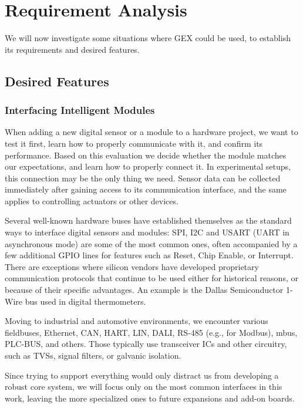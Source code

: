 \chapter{Requirement Analysis}

We will now investigate some situations where GEX could be used, to establish its requirements and desired features.

\section{Desired Features}

\subsection{Interfacing Intelligent Modules}\label{sec:uses_digital_ifaces}

When adding a new digital sensor or a module to a hardware project, we want to test it first, learn how to properly communicate with it, and confirm its performance. Based on this evaluation we decide whether the module matches our expectations, and learn how to properly connect it. In experimental setups, this connection may be the only thing we need. Sensor data can be collected immediately after gaining access to its communication interface, and the same applies to controlling actuators or other devices.

Several well-known hardware buses have established themselves as the standard ways to interface digital sensors and modules: \gls{SPI}, \gls{I2C} and \gls{USART} (\gls{UART} in asynchronous mode) are some of the most common ones, often accompanied by a few additional \gls{GPIO} lines for features such as Reset, Chip Enable, or Interrupt. There are exceptions where silicon vendors have developed proprietary communication protocols that continue to be used either for historical reasons, or because of their specific advantages. An example is the Dallas Semiconductor 1-Wire bus used in digital thermometers.

Moving to industrial and automotive environments, we encounter various fieldbuses, Ethernet, \gls{CAN}, \gls{HART}, \gls{LIN}, \gls{DALI}, RS-485 (e.g., for Modbus), \gls{mbus}, PLC-BUS, and others. Those typically use transceiver \glspl{IC} and other circuitry, such as \glspl{TVS}, signal filters, or galvanic isolation. 

Since trying to support everything would only distract us from developing a robust core system, we will focus only on the most common interfaces in this work, leaving the more specialized ones to future expansions and add-on boards.

